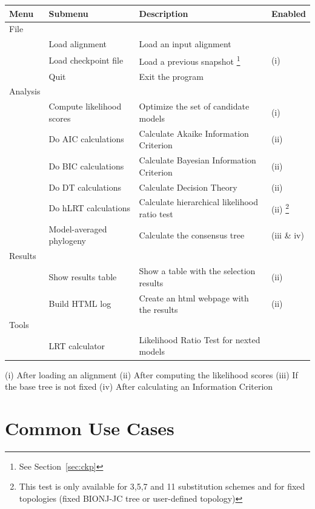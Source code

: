\documentclass[11pt,twoside,a4paper]{article}
\begin{document}
\begin{minipage}{1\textwidth}
\small
\begin{tabular}{l l l l}
\hline
{\bf Menu} & {\bf Submenu} & {\bf Description} & {\bf Enabled} \\
\hline
File \\
& Load alignment & Load an input alignment & \\
& Load checkpoint file & Load a previous snapshot \footnote{See Section~\ref{sec:ckp}} & (i) \\
& Quit & Exit the program & \\
\hline
Analysis \\
& Compute likelihood scores & Optimize the set of candidate models & (i) \\
& Do AIC calculations & Calculate Akaike Information Criterion & (ii) \\
& Do BIC calculations & Calculate Bayesian Information Criterion & (ii) \\
& Do DT calculations & Calculate Decision Theory & (ii) \\
& Do hLRT calculations & Calculate hierarchical likelihood ratio test & (ii) \footnote{This test is only available for 3,5,7 and 11 substitution schemes and for fixed topologies (fixed BIONJ-JC tree or user-defined topology)} \\
& Model-averaged phylogeny & Calculate the consensus tree & (iii \& iv)  \\
\hline
Results \\
& Show results table & Show a table with the selection results & (ii) \\
& Build HTML log & Create an html webpage with the results & (ii) \\
\hline
Tools \\
& LRT calculator & Likelihood Ratio Test for nexted models & \\
\hline
\end{tabular}

\vspace{1em}
(i) After loading an alignment (ii) After computing the likelihood scores (iii) If the base tree is not fixed (iv) After calculating an Information Criterion
\end{minipage}





\section{Common Use Cases}
\end{document}
